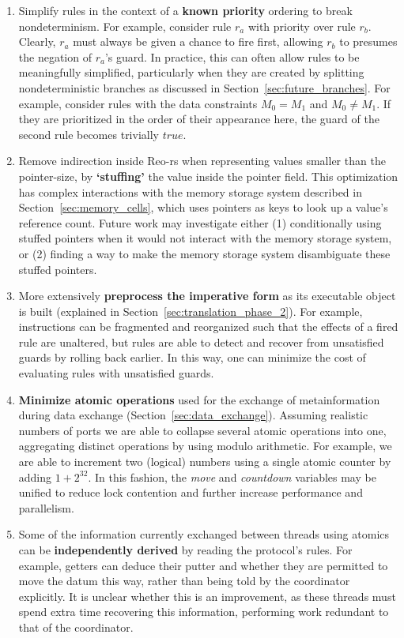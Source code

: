 \begin{enumerate}
	\item Simplify rules in the context of a \textbf{known priority} ordering to break nondeterminism. For example, consider rule $r_a$ with priority over rule $r_b$. Clearly, $r_a$ must always be given a chance to fire first, allowing $r_b$ to presumes the negation of $r_a$'s guard. In practice, this can often allow rules to be meaningfully simplified, particularly when they are created by splitting nondeterministic branches as discussed in Section~\ref{sec:future_branches}. For example, consider rules with the data constraints $M_0=M_1$ and $M_0\neq{}M_1$. If they are prioritized in the order of their appearance here, the guard of the second rule becomes trivially $true$.
	
	\item Remove indirection inside Reo-rs when representing values smaller than the pointer-size, by \textbf{`stuffing'} the value inside the pointer field. This optimization has complex interactions with the memory storage system described in Section~\ref{sec:memory_cells}, which uses pointers as keys to look up a value's reference count. Future work may investigate either (1) conditionally using stuffed pointers when it would not interact with the memory storage system, or (2) finding a way to make the memory storage system disambiguate these stuffed pointers.
	
	
	\item More extensively \textbf{preprocess the imperative form} as its executable object is built (explained in Section~\ref{sec:translation_phase_2}). For example, instructions can be fragmented and reorganized such that the effects of a fired rule are unaltered, but rules are able to detect and recover from unsatisfied guards by rolling back earlier. In this way, one can minimize the cost of evaluating rules with unsatisfied guards.
	
	\item \textbf{Minimize atomic operations} used for the exchange of metainformation during data exchange (Section~\ref{sec:data_exchange}). Assuming realistic numbers of ports we are able to collapse several atomic operations into one, aggregating distinct operations by using modulo arithmetic. For example, we are able to increment two (logical) numbers using a single atomic counter by adding $1 + 2^{32}$. In this fashion, the \textit{move} and \textit{countdown} variables may be unified to reduce lock contention and further increase performance and parallelism.
	
	\item Some of the information currently exchanged between threads using atomics can be \textbf{independently derived} by reading the protocol's rules. For example, getters can deduce their putter and whether they are permitted to move the datum this way, rather than being told by the coordinator explicitly. It is unclear whether this is an improvement, as these threads must spend extra time recovering this information, performing work redundant to that of the coordinator. 
\end{enumerate}
